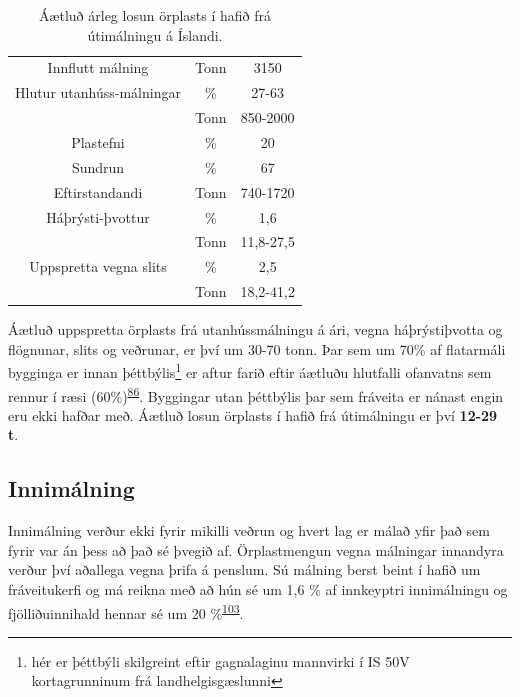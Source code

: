 \documentclass[icelandic,]{book}
\let\rmarkdownfootnote\footnote%
\def\footnote{\protect\rmarkdownfootnote}
\begin{document}
\begin{table}[t]

\caption{\label{tab:malningartafla}Áætluð árleg losun örplasts í hafið frá útimálningu á Íslandi.}
\centering
\begin{tabular}{ccc}
\toprule
Innflutt málning & Tonn & 3150\\
Hlutur utanhúss-málningar & \% & 27-63\\
 & Tonn & 850-2000\\
Plastefni & \% & 20\\
Sundrun & \% & 67\\
\addlinespace
Eftirstandandi & Tonn & 740-1720\\
Háþrýsti-þvottur & \% & 1,6\\
 & Tonn & 11,8-27,5\\
Uppspretta vegna slits & \% & 2,5\\
 & Tonn & 18,2-41,2\\
\bottomrule
\end{tabular}
\end{table}

Áætluð uppspretta örplasts frá utanhússmálningu á ári, vegna háþrýstiþvotta og flögnunar, slits og veðrunar, er því um 30-70 tonn. Þar sem um 70\% af flatarmáli bygginga er innan þéttbýlis\footnote{hér er þéttbýli skilgreint eftir gagnalaginu mannvirki í IS 50V kortagrunninum frá landhelgisgæslunni} er aftur farið eftir áætluðu hlutfalli ofanvatns sem rennur í ræsi (60\%)\textsuperscript{\protect\hyperlink{ref-Verschoor2016}{86}}. Byggingar utan þéttbýlis þar sem fráveita er nánast engin eru ekki hafðar með. Áætluð losun örplasts í hafið frá útimálningu er því \textbf{12-29 t}.

\hypertarget{innimalning}{%
\subsection*{Innimálning}\label{innimalning}}

Innimálning verður ekki fyrir mikilli veðrun og hvert lag er málað yfir það sem fyrir var án þess að það sé þvegið af. Örplastmengun vegna málningar innandyra verður því aðallega vegna þrifa á penslum. Sú málning berst beint í hafið um fráveitukerfi og má reikna með að hún sé um 1,6 \% af innkeyptri innimálningu og fjölliðuinnihald hennar sé um 20 \%\textsuperscript{\protect\hyperlink{ref-Hann2018}{103}}.
\end{document}
